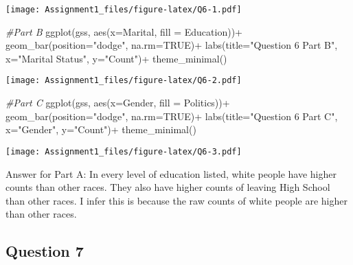 \documentclass[
]{article}
\newenvironment{Shaded}{\begin{snugshade}}{\end{snugshade}}
\newcommand{\AttributeTok}[1]{\textcolor[rgb]{0.77,0.63,0.00}{#1}}
\newcommand{\CommentTok}[1]{\textcolor[rgb]{0.56,0.35,0.01}{\textit{#1}}}
\newcommand{\ConstantTok}[1]{\textcolor[rgb]{0.00,0.00,0.00}{#1}}
\newcommand{\FunctionTok}[1]{\textcolor[rgb]{0.00,0.00,0.00}{#1}}
\newcommand{\NormalTok}[1]{#1}
\newcommand{\SpecialCharTok}[1]{\textcolor[rgb]{0.00,0.00,0.00}{#1}}
\newcommand{\StringTok}[1]{\textcolor[rgb]{0.31,0.60,0.02}{#1}}
\begin{document}
\texttt{[image: Assignment1\_files/figure-latex/Q6-1.pdf]}

\begin{Shaded}
\begin{Highlighting}[]
\CommentTok{\#Part B}
\FunctionTok{ggplot}\NormalTok{(gss, }\FunctionTok{aes}\NormalTok{(}\AttributeTok{x=}\NormalTok{Marital, }\AttributeTok{fill =}\NormalTok{ Education))}\SpecialCharTok{+}
  \FunctionTok{geom\_bar}\NormalTok{(}\AttributeTok{position=}\StringTok{"dodge"}\NormalTok{, }\AttributeTok{na.rm=}\ConstantTok{TRUE}\NormalTok{)}\SpecialCharTok{+}
  \FunctionTok{labs}\NormalTok{(}\AttributeTok{title=}\StringTok{"Question 6 Part B"}\NormalTok{, }\AttributeTok{x=}\StringTok{"Marital Status"}\NormalTok{, }\AttributeTok{y=}\StringTok{"Count"}\NormalTok{)}\SpecialCharTok{+}
  \FunctionTok{theme\_minimal}\NormalTok{()}
\end{Highlighting}
\end{Shaded}

\texttt{[image: Assignment1\_files/figure-latex/Q6-2.pdf]}

\begin{Shaded}
\begin{Highlighting}[]
\CommentTok{\#Part C}
\FunctionTok{ggplot}\NormalTok{(gss, }\FunctionTok{aes}\NormalTok{(}\AttributeTok{x=}\NormalTok{Gender, }\AttributeTok{fill =}\NormalTok{ Politics))}\SpecialCharTok{+}
  \FunctionTok{geom\_bar}\NormalTok{(}\AttributeTok{position=}\StringTok{"dodge"}\NormalTok{, }\AttributeTok{na.rm=}\ConstantTok{TRUE}\NormalTok{)}\SpecialCharTok{+}
  \FunctionTok{labs}\NormalTok{(}\AttributeTok{title=}\StringTok{"Question 6 Part C"}\NormalTok{, }\AttributeTok{x=}\StringTok{"Gender"}\NormalTok{, }\AttributeTok{y=}\StringTok{"Count"}\NormalTok{)}\SpecialCharTok{+}
  \FunctionTok{theme\_minimal}\NormalTok{()}
\end{Highlighting}
\end{Shaded}

\texttt{[image: Assignment1\_files/figure-latex/Q6-3.pdf]}

Answer for Part A: In every level of education listed, white people have
higher counts than other races. They also have higher counts of leaving
High School than other races. I infer this is because the raw counts of
white people are higher than other races.

\hypertarget{question-7}{%
\subsection{Question 7}\label{question-7}}
\end{document}
